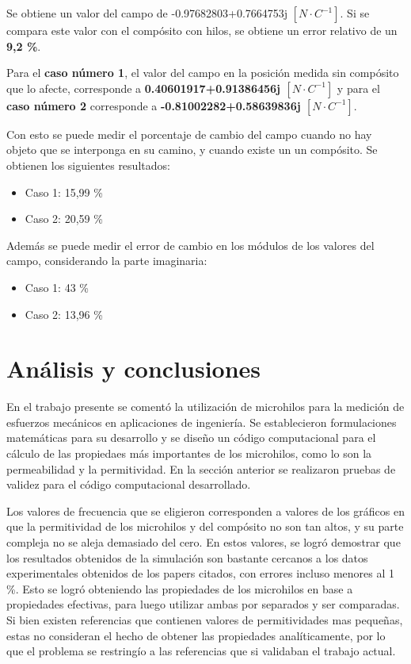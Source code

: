 \documentclass[12pt,letterpaper]{article}
\numberwithin{equation}{section}
\begin{document}
Se obtiene un valor del campo de -0.97682803+0.7664753j $[N \cdot C^{-1}]$. Si se compara este valor con el compósito con hilos, se obtiene un error relativo de un \textbf{9,2 \%}.

Para el \textbf{caso número 1}, el valor del campo en la posición medida sin compósito que lo afecte, corresponde a \textbf{0.40601917+0.91386456j $[N \cdot C^{-1}]$} y para el \textbf{caso número 2} corresponde a \textbf{-0.81002282+0.58639836j $[N \cdot C^{-1}]$}.

Con esto se puede medir el porcentaje de cambio del campo cuando no hay objeto que se interponga en su camino, y cuando existe un un compósito. Se obtienen los siguientes resultados:

\begin{itemize}
	\item Caso 1: 15,99 \%
	\item Caso 2: 20,59 \%
\end{itemize}

Además se puede medir el error de cambio en los módulos de los valores del campo, considerando la parte imaginaria:

\begin{itemize}
	\item Caso 1: 43 \%
	\item Caso 2: 13,96 \%
\end{itemize}


\section{Análisis y conclusiones} \label{sec:Analisis y conclusiones}

En el trabajo presente se comentó la utilización de microhilos para la medición de esfuerzos mecánicos en aplicaciones de ingeniería. Se establecieron formulaciones matemáticas para su desarrollo  y se diseño un código computacional para el cálculo de las propiedaes más importantes de los microhilos, como lo son la permeabilidad y la permitividad. En la sección anterior se realizaron pruebas de validez para el código computacional desarrollado. 

Los valores de frecuencia que se eligieron corresponden a valores de los gráficos en que la permitividad de los microhilos y del compósito no son tan altos, y su parte compleja no se aleja demasiado del cero. En estos valores, se logró demostrar que los resultados obtenidos de la simulación son bastante cercanos a los datos experimentales obtenidos de los papers citados, con errores incluso menores al 1 \%. Esto se logró obteniendo las propiedades de los microhilos en base a propiedades efectivas, para luego utilizar ambas por separados y ser comparadas. Si bien existen referencias que contienen valores de permitividades mas pequeñas, estas no consideran el hecho de obtener las propiedades analíticamente, por lo que el problema se restringío a las referencias que si validaban el trabajo actual.
\end{document}
